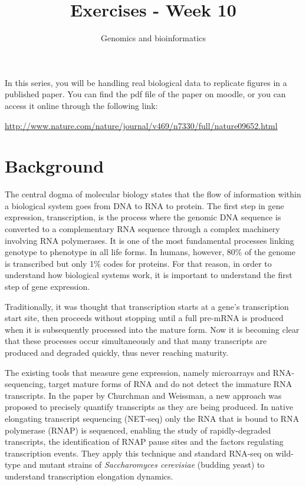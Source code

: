 \documentclass[a4paper,11pt]{article}
\title{Exercises - Week 10}
\date{}
\author{Genomics and bioinformatics}
\begin{document}
\maketitle

\indent In this series, you will be handling real biological data to replicate figures in a published paper. You can find the pdf file of the paper on moodle, or you can access it online through the following link:

\url{http://www.nature.com/nature/journal/v469/n7330/full/nature09652.html}

\section{Background}
\indent The central dogma of molecular biology states that the flow of information within a biological system goes from DNA to RNA to protein. The first step in gene expression, transcription, is the process where the genomic DNA sequence is converted to a complementary RNA sequence through a complex machinery involving RNA polymerases. It is one of the most fundamental processes linking genotype to phenotype in all life forms. In humans, however, 80\% of the genome is transcribed but only 1\% codes for proteins. For that reason, in order to understand how biological systems work, it is important to understand the first step of gene expression.

\indent Traditionally, it was thought that transcription starts at a gene's transcription start site, then proceeds without stopping until a full pre-mRNA is produced when it is subsequently processed into the mature form. Now it is becoming clear that these processes  occur simultaneously and that many transcripts are produced and degraded quickly, thus never reaching maturity.

\indent The existing tools that measure gene expression, namely microarrays and RNA-sequencing, target mature forms of RNA and do not detect the immature RNA transcripts. In the paper by Churchman and Weissman, a new approach was proposed to  precisely quantify transcripts as they are being produced. In native elongating transcript sequencing (NET-seq) only the RNA that is bound to RNA polymerase (RNAP) is sequenced, enabling the study of rapidly-degraded transcripts, the identification of RNAP pause sites and the factors regulating transcription events. They apply this technique and standard RNA-seq on wild-type and mutant strains of \textit{Saccharomyces cerevisiae} (budding yeast) to understand transcription elongation dynamics.
\end{document}
